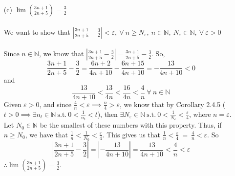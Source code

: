 \documentclass[12pt,letterpaper]{article}
\newcommand{\st}{\ \text{s.t.}\ }
\newcommand{\abs}[1]{\left\lvert #1 \right\rvert}
\newcommand{\N}{\mathbb{N}}
\theoremstyle{case}
\begin{document}
\begin{enumerate}
\begin{enumerate}
\begin{enumerate}
					\item[(c)] $\lim (\frac{3n+1}{2n+5})=\frac{3}{2}$
					\\\\We want to show that \(\abs{\frac{3n+1}{2n+5}-\frac{3}{2}} < \varepsilon,\ \forall\ n \geq N_\varepsilon,\ n \in \N,\ N_\varepsilon \in \N,\ \forall\ \varepsilon > 0\)
					\\\\Since \(n \in \N\), we know that \(\abs{\frac{3n+1}{2n+5}-\frac{3}{2}} = \frac{3n+1}{2n+5}-\frac{3}{2}\). So,
					\[\frac{3n+1}{2n+5}-\frac{3}{2}=\frac{6n+2}{4n+10}-\frac{6n+15}{4n+10}=-\frac{13}{4n+10} < 0\]
					and
					\[\frac{13}{4n+10} < \frac{13}{4n} < \frac{16}{4n} < \frac{4}{n}\ \forall\ n \in \N\]
					Given $\varepsilon > 0$, and since $\frac{4}{n} < \varepsilon \implies \frac{n}{4} > \varepsilon$, we know that by Corollary 2.4.5 ($t > 0 \implies \exists n_t \in \N \st 0 < \frac{1}{n_t} < t$), then  $\exists N_\varepsilon \in \N \st 0 < \frac{1}{N_\varepsilon} < \frac{\varepsilon}{4}$, where $n = \varepsilon$. Let $N_0 \in \N$ be the smallest of these numbers with this property. Thus, if $n \geq N_0$, we have that $\frac{1}{n} < \frac{1}{N_0} < \frac{\varepsilon}{4}$. This gives us that $\frac{1}{n} < \frac{\varepsilon}{4}\ =\ \frac{4}{n} < \varepsilon$. So
					\[\abs{\frac{3n+1}{2n+5}-\frac{3}{2}}=\abs{-\frac{13}{4n+10}}=\frac{13}{4n+10}<\frac{4}{n}<\varepsilon\]
					$\therefore \lim (\frac{3n+1}{2n+5})=\frac{3}{2}$.
					

\end{enumerate}
\end{enumerate}
\end{enumerate}
\end{document}
